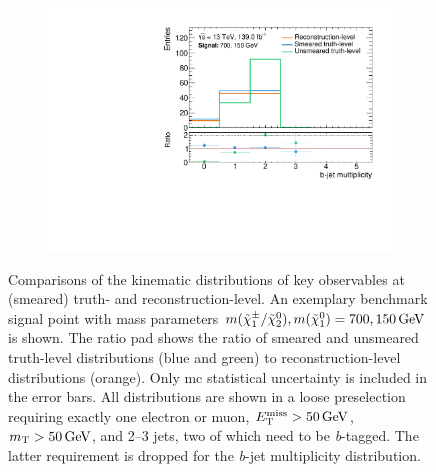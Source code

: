 \begin{figure}
\begin{subfigure}[b]{0.47\linewidth}
		\centering\includegraphics[width=\textwidth]{20210324/700_150/nBJet30_C1N2_Wh_hbb_700p0_150p0_smeared.pdf}
	\end{subfigure}\hfill
	\caption{Comparisons of the kinematic distributions of key observables at (smeared) truth- and reconstruction-level. An exemplary benchmark signal point with mass parameters $m(\charg/\neutr), m(\lsp) = 700, \SI{150}{\GeV}$ is shown. The ratio pad shows the ratio of smeared and unsmeared truth-level distributions (blue and green) to reconstruction-level distributions (orange). Only \gls{mc} statistical uncertainty is included in the error bars. All distributions are shown in a loose preselection requiring exactly one electron or muon, $\met>\SI{50}{\GeV}$, $\mt > \SI{50}{\GeV}$, and 2--3 jets, two of which need to be \textit{b}-tagged. The latter requirement is dropped for the \textit{b}-jet multiplicity distribution.}
	\label{fig:smearing_preselection}
\end{figure}
 
